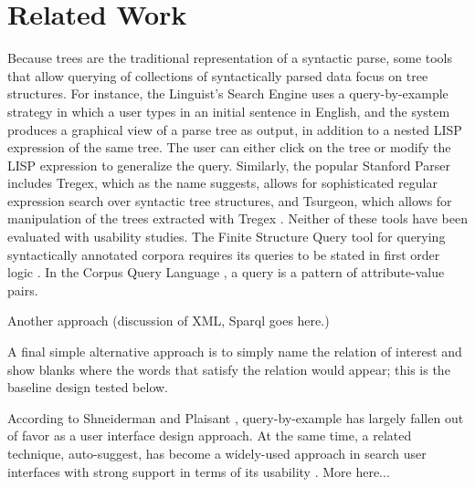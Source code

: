 
\section{Related Work}

Because trees are the traditional representation of a syntactic parse, some  tools that allow querying of  collections of syntactically parsed data focus on tree structures.   For instance, the Linguist's Search Engine \cite{resnik2005web} uses a query-by-example strategy in which a user types in an initial sentence in English, and the system produces a graphical view of a parse tree as output, in addition to a nested LISP expression of the same tree.  The user can either click on the tree or modify the LISP expression to generalize the query.    Similarly, the popular Stanford Parser includes Tregex, which as the name suggests,  allows for sophisticated regular expression search over syntactic tree structures, and Tsurgeon, which allows for manipulation of the trees extracted with Tregex \cite{levy2006tregex}.  Neither of these tools have been evaluated with usability studies.  The Finite Structure Query tool for querying syntactically annotated corpora requires its queries to be stated in first order logic \cite{kepser2003finite}. In the Corpus Query Language \cite{jakubicek2010fast}, a query is a pattern of attribute-value pairs.

Another approach (discussion of XML, Sparql goes here.)

A final simple alternative approach is to simply name the relation of interest and show blanks where the words that satisfy the relation would appear; this is the baseline design tested below.

According to Shneiderman and Plaisant \cite{shneiderman2010designing}, query-by-example has largely fallen out of favor as a user interface design approach.  At the same time, a related technique, auto-suggest, has become a widely-used approach in search user interfaces with strong support in terms of its usability \cite{hearst2009search}.  More here...
